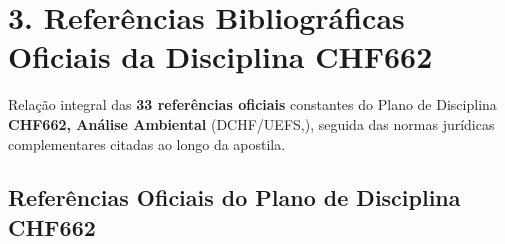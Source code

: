 \clearpage
\section*{3. Referências Bibliográficas Oficiais da Disciplina CHF662}

\noindent Relação integral das \textbf{33 referências oficiais} constantes do Plano de Disciplina \textbf{CHF662, Análise Ambiental} (DCHF/UEFS,), seguida das normas jurídicas complementares citadas ao longo da apostila.

\vspace{6pt}
\subsection*{Referências Oficiais do Plano de Disciplina CHF662}

